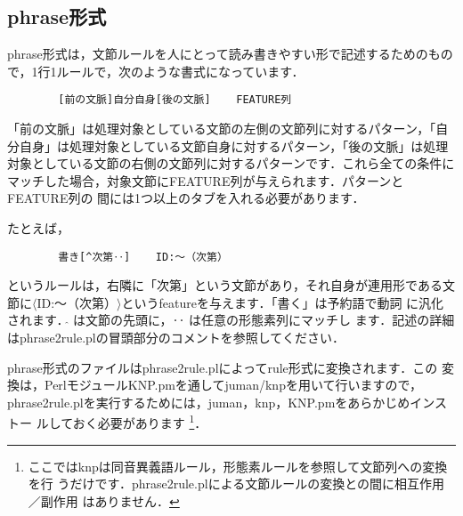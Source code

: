 \documentclass[a4j,11pt,titlepage]{jarticle}
\def\fl{$\langle$}
\def\fr{$\rangle$}
\begin{document}
\subsection{phrase形式}
\label{rule::phrase}

phrase形式は，文節ルールを人にとって読み書きやすい形で記述するためのもの
で，1行1ルールで，次のような書式になっています．
\begin{verbatim}
        [前の文脈]自分自身[後の文脈]    FEATURE列
\end{verbatim}
「前の文脈」は処理対象としている文節の左側の文節列に対するパターン，「自
分自身」は処理対象としている文節自身に対するパターン，「後の文脈」は処理
対象としている文節の右側の文節列に対するパターンです．これら全ての条件に
マッチした場合，対象文節にFEATURE列が与えられます．パターンとFEATURE列の
間には1つ以上のタブを入れる必要があります．

たとえば，
\begin{verbatim}
        書き[^次第‥]    ID:〜（次第）
\end{verbatim}
というルールは，右隣に「次第」という文節があり，それ自身が連用形である文
節に\fl ID:〜（次第）\fr というfeatureを与えます．「書く」は予約語で動詞
に汎化されます．$\hat{ }$ は文節の先頭に，‥ は任意の形態素列にマッチし
ます．記述の詳細はphrase2rule.plの冒頭部分のコメントを参照してください．

phrase形式のファイルはphrase2rule.plによってrule形式に変換されます．この
変換は，PerlモジュールKNP.pmを通してjuman/knpを用いて行いますので，
phrase2rule.plを実行するためには，juman，knp，KNP.pmをあらかじめインストー
ルしておく必要があります
\footnote{
ここではknpは同音異義語ルール，形態素ルールを参照して文節列への変換を行
うだけです．phrase2rule.plによる文節ルールの変換との間に相互作用／副作用
はありません．}．
\end{document}
